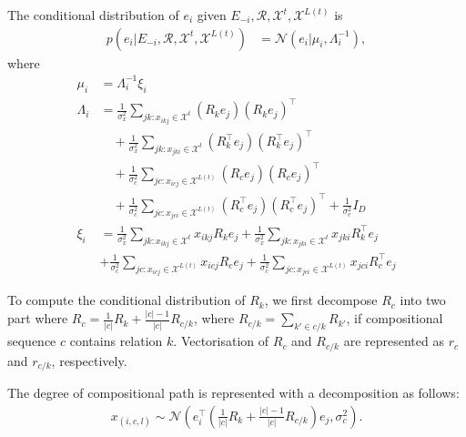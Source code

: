 The conditional distribution of $e_i$ given $E_{-i}, \mathcal{R}, \mathcal{X}^{t}, \mathcal{X}^{L(t)}$ is 
\begin{align} \label{eqn:sample_e}
p(e_i |E_{-i}, \mathcal{R}, \mathcal{X}^{t}, \mathcal{X}^{L(t)}) &= \mathcal{N}(e_i | \mu_i, \Lambda_i^{-1}),
\end{align}
where
\begin{align*}
\mu_i &= \Lambda_i^{-1}\xi_i \\
\Lambda_i &= \frac{1}{\sigma_x^2} \sum_{jk : x_{ikj} \in \mathcal{X}^{t}} (R_k e_j)(R_k e_j)^\top \\
&\quad+ \frac{1}{\sigma_x^2} \sum_{jk : x_{jki} \in \mathcal{X}^{t}} (R_k^\top e_j)(R_k^\top e_j)^\top \\
&\quad + \frac{1}{\sigma_c^2} \sum_{jc : x_{icj} \in \mathcal{X}^{L(t)}} (R_c e_j)(R_c e_j)^\top \\
&\quad+ \frac{1}{\sigma_c^2} \sum_{jc : x_{jci} \in \mathcal{X}^{L(t)}} (R_c^\top e_j)(R_c^\top e_j)^\top + \frac{1}{\sigma_e^2} {I}_D \\
\xi_i &= \frac{1}{\sigma_x^2}\sum_{jk : x_{ikj} \in \mathcal{X}^{t}}  x_{ikj} R_{k} e_{j} + \frac{1}{\sigma_x^2}\sum_{jk : x_{jki} \in \mathcal{X}^{t}} x_{jki} R_{k}^\top e_{j} \\
& + \frac{1}{\sigma_c^2}\sum_{jc : x_{icj} \in \mathcal{X}^{L(t)}}  x_{icj} R_{c} e_{j} + \frac{1}{\sigma_c^2}\sum_{jc : x_{jci} \in \mathcal{X}^{L(t)}} x_{jci} R_{c}^\top e_{j}
\end{align*}

To compute the conditional distribution of $R_k$, we first decompose $R_c$ into two part where $R_c = \frac{1}{|c|} R_k + \frac{|c|-1}{|c|}R_{c/k}$, where $R_{c/k} = \sum_{k' \in c/k} R_{k'}$, if compositional sequence $c$ contains relation $k$. Vectorisation of $R_c$ and $R_{c/k}$ are represented as $r_c$ and $r_{c/k}$, respectively.

The degree of compositional path is represented with a decomposition as follows:
\begin{align}
x_{(i, c, l)} \sim \mathcal{N}(e_i^\top (\frac{1}{|c|} R_k + \frac{|c|-1}{|c|}R_{c/k}) e_j, \sigma_{c}^2).
\end{align}


